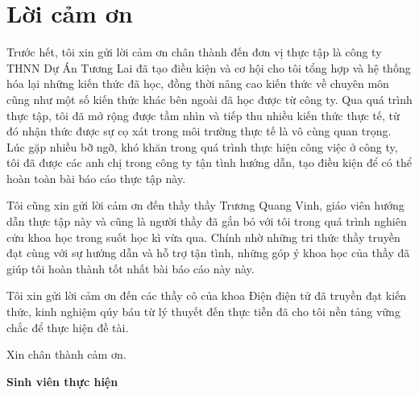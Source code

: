 \chapter*{Lời cảm ơn}
Trước hết, tôi xin gửi lời cảm ơn chân thành đến đơn vị thực tập là công ty THNN Dự Án Tương Lai đã tạo điều kiện và cơ hội
cho tôi tổng hợp và hệ thống hóa lại những kiến thức đã học, đồng thời nâng cao kiến thức về chuyên môn
cũng như một số kiến thức khác bên ngoài đã học được từ công ty.
Qua quá trình thực tập, tôi đã mở rộng được tầm nhìn và tiếp thu nhiều kiến thức thực tế, từ đó
nhận thức được sự cọ xát trong môi trường thực tế là vô cùng quan trọng.
Lúc gặp nhiều bỡ ngỡ, khó khăn trong quá trình thực hiện công việc ở công ty, tôi đã được các anh chị
trong công ty tận tình hướng dẫn, tạo điều kiện để có thể hoàn toàn bài báo cáo thực tập này.

Tôi cũng xin gửi lời cảm ơn đến thầy thầy Trương Quang Vinh,
giáo viên hướng dẫn thực tập này và cũng là người thầy đã gắn bó với tôi trong quá trình nghiên cứu khoa học trong suốt học kì vừa qua.
Chính nhờ những tri thức thầy truyền đạt cùng với sự hướng dẫn và hỗ trợ tận tình, những góp ý khoa học của thầy đã giúp tôi hoàn thành tốt nhất bài báo cáo này này.

Tôi xin gửi lời cảm ơn đến các thầy cô của khoa Điện điện tử đã truyền đạt kiến thức,
kinh nghiệm qúy báu từ lý thuyết đến thực tiễn đã cho tôi nền tảng vững chắc để thực hiện đề tài.

Xin chân thành cảm ơn.
\begin{flushright}
\textbf{Sinh viên thực hiện}
\end{flushright}
